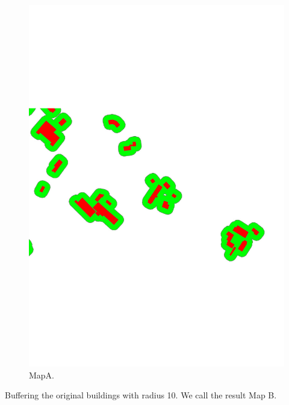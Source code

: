 \documentclass[graybox]{svmult}
\begin{document}
\begin{figure}[tb]
	\centering
	\includegraphics[width=\linewidth]{MapA}
	\caption{MapA.}
	\label{fig:MapA}
\end{figure}

Buffering the original buildings with radius 10. We call the 
result Map B.
\end{document}
